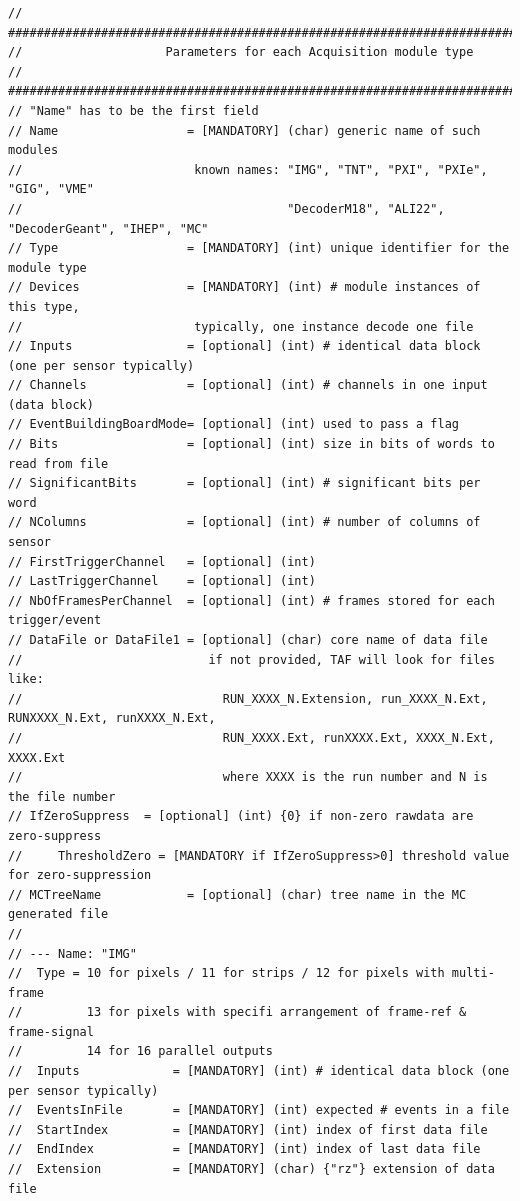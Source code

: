 \documentclass[a4paper, 12pt, twoside]{article}
\begin{document}
\begin{verbatim}
// #############################################################################
//                    Parameters for each Acquisition module type
// #############################################################################
// "Name" has to be the first field
// Name                  = [MANDATORY] (char) generic name of such modules
//                        known names: "IMG", "TNT", "PXI", "PXIe", "GIG", "VME"
//                                     "DecoderM18", "ALI22", "DecoderGeant", "IHEP", "MC"
// Type                  = [MANDATORY] (int) unique identifier for the module type
// Devices               = [MANDATORY] (int) # module instances of this type,
//                        typically, one instance decode one file
// Inputs                = [optional] (int) # identical data block (one per sensor typically)
// Channels              = [optional] (int) # channels in one input (data block)
// EventBuildingBoardMode= [optional] (int) used to pass a flag
// Bits                  = [optional] (int) size in bits of words to read from file
// SignificantBits       = [optional] (int) # significant bits per word
// NColumns              = [optional] (int) # number of columns of sensor
// FirstTriggerChannel   = [optional] (int)
// LastTriggerChannel    = [optional] (int)
// NbOfFramesPerChannel  = [optional] (int) # frames stored for each trigger/event
// DataFile or DataFile1 = [optional] (char) core name of data file
//                          if not provided, TAF will look for files like:
//                            RUN_XXXX_N.Extension, run_XXXX_N.Ext, RUNXXXX_N.Ext, runXXXX_N.Ext,
//                            RUN_XXXX.Ext, runXXXX.Ext, XXXX_N.Ext, XXXX.Ext
//                            where XXXX is the run number and N is the file number
// IfZeroSuppress  = [optional] (int) {0} if non-zero rawdata are zero-suppress
//     ThresholdZero = [MANDATORY if IfZeroSuppress>0] threshold value for zero-suppression
// MCTreeName            = [optional] (char) tree name in the MC generated file
//
// --- Name: "IMG"
//  Type = 10 for pixels / 11 for strips / 12 for pixels with multi-frame
//         13 for pixels with specifi arrangement of frame-ref & frame-signal
//         14 for 16 parallel outputs
//  Inputs             = [MANDATORY] (int) # identical data block (one per sensor typically)
//  EventsInFile       = [MANDATORY] (int) expected # events in a file
//  StartIndex         = [MANDATORY] (int) index of first data file
//  EndIndex           = [MANDATORY] (int) index of last data file
//  Extension          = [MANDATORY] (char) {"rz"} extension of data file

\end{verbatim}
\end{document}
